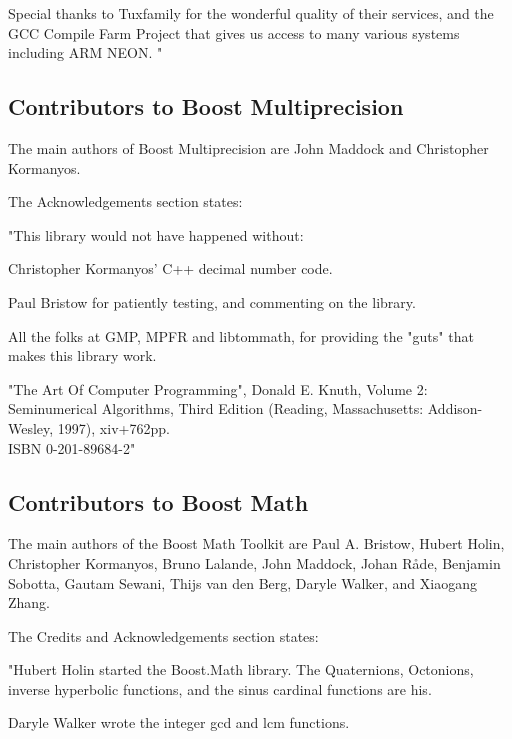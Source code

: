 \vpara
Special thanks to Tuxfamily for the wonderful quality of their services, and the GCC Compile Farm Project that gives us access to many various systems including ARM NEON. "


%
%
%



\subsection{Contributors to Boost Multiprecision}
\label{Contributors to Boost Multiprecision}
The main authors of Boost Multiprecision are John Maddock and Christopher Kormanyos.

\vpara
The Acknowledgements section states:

\vpara
"This library would not have happened without:

Christopher Kormanyos' C++ decimal number code.

Paul Bristow for patiently testing, and commenting on the library.

All the folks at GMP, MPFR and libtommath, for providing the "guts" that makes this library work.

"The Art Of Computer Programming", Donald E. Knuth, Volume 2: Seminumerical Algorithms, Third Edition (Reading, Massachusetts: Addison-Wesley, 1997), xiv+762pp. \\
ISBN 0-201-89684-2"



\subsection{Contributors to Boost Math}
\label{Contributors to Boost Math}
The main authors of the Boost Math Toolkit are Paul A. Bristow, Hubert Holin, Christopher Kormanyos, Bruno Lalande, John Maddock, Johan Råde, Benjamin Sobotta, Gautam
Sewani, Thijs van den Berg, Daryle Walker, and Xiaogang Zhang.

\vpara
The Credits and Acknowledgements section states:

\vpara
"Hubert Holin started the Boost.Math library. The Quaternions, Octonions, inverse hyperbolic functions, and the sinus cardinal functions are his.

\vpara
Daryle Walker wrote the integer gcd and lcm functions.

